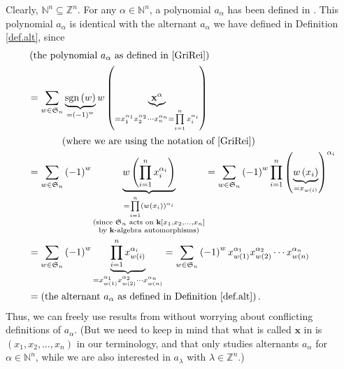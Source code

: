 \documentclass[numbers=enddot,12pt,final,onecolumn,notitlepage]{scrartcl}%
\theoremstyle{definition}
\let\sumnonlimits\sum
\let\prodnonlimits\prod
\renewcommand{\sum}{\sumnonlimits\limits}
\renewcommand{\prod}{\prodnonlimits\limits}
\newenvironment{verlong}{}{}
\begin{document}
\begin{verlong}
Clearly, $\mathbb{N}^{n}\subseteq\mathbb{Z}^{n}$. For any $\alpha\in
\mathbb{N}^{n}$, a polynomial $a_{\alpha}$ has been defined in
\cite[Definition 2.6.2]{GriRei}. This polynomial $a_{\alpha}$ is identical
with the alternant $a_{\alpha}$ we have defined in Definition \ref{def.alt},
since%
\begin{align*}
&  \left(  \text{the polynomial }a_{\alpha}\text{ as defined in
\cite[Definition 2.6.2]{GriRei}}\right) \\
&  =\sum_{w\in\mathfrak{S}_{n}}\underbrace{\operatorname*{sgn}\left(
w\right)  }_{=\left(  -1\right)  ^{w}}w\left(  \underbrace{\mathbf{x}^{\alpha
}}_{=x_{1}^{\alpha_{1}}x_{2}^{\alpha_{2}}\cdots x_{n}^{\alpha_{n}}=\prod
_{i=1}^{n}x_{i}^{\alpha_{i}}}\right) \\
&  \ \ \ \ \ \ \ \ \ \ \left(  \text{where we are using the notation of
\cite[Definition 2.6.2]{GriRei}}\right) \\
&  =\sum_{w\in\mathfrak{S}_{n}}\left(  -1\right)  ^{w}\underbrace{w\left(
\prod_{i=1}^{n}x_{i}^{\alpha_{i}}\right)  }_{\substack{=\prod_{i=1}^{n}\left(
w\left(  x_{i}\right)  \right)  ^{\alpha_{i}}\\\text{(since }\mathfrak{S}%
_{n}\text{ acts on }\mathbf{k}\left[  x_{1},x_{2},\ldots,x_{n}\right]
\\\text{by }\mathbf{k}\text{-algebra automorphisms)}}}=\sum_{w\in
\mathfrak{S}_{n}}\left(  -1\right)  ^{w}\prod_{i=1}^{n}\left(
\underbrace{w\left(  x_{i}\right)  }_{=x_{w\left(  i\right)  }}\right)
^{\alpha_{i}}\\
&  =\sum_{w\in\mathfrak{S}_{n}}\left(  -1\right)  ^{w}\underbrace{\prod
_{i=1}^{n}x_{w\left(  i\right)  }^{\alpha_{i}}}_{=x_{w\left(  1\right)
}^{\alpha_{1}}x_{w\left(  2\right)  }^{\alpha_{2}}\cdots x_{w\left(  n\right)
}^{\alpha_{n}}}=\sum_{w\in\mathfrak{S}_{n}}\left(  -1\right)  ^{w}x_{w\left(
1\right)  }^{\alpha_{1}}x_{w\left(  2\right)  }^{\alpha_{2}}\cdots x_{w\left(
n\right)  }^{\alpha_{n}}\\
&  =\left(  \text{the alternant }a_{\alpha}\text{ as defined in Definition
\ref{def.alt}}\right)  .
\end{align*}
Thus, we can freely use results from \cite[\S 2.6]{GriRei} without worrying
about conflicting definitions of $a_{\alpha}$. (But we need to keep in mind
that what is called $\mathbf{x}$ in \cite[\S 2.6]{GriRei} is $\left(
x_{1},x_{2},\ldots,x_{n}\right)  $ in our terminology, and that \cite[\S 2.6]%
{GriRei} only studies alternants $a_{\alpha}$ for $\alpha\in\mathbb{N}^{n}$,
while we are also interested in $a_{\lambda}$ with $\lambda\in\mathbb{Z}^{n}$.)
\end{verlong}
\end{document}
